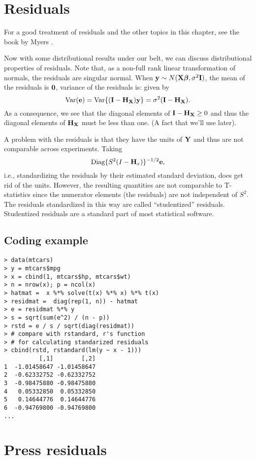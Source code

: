 \section{Residuals}

For a good treatment of residuals and the other topics in this chapter, 
see the book by Myers \citep{myers1990classical}.

Now with some distributional results under our belt, we can discuss distributional
properties of residuals. Note that, as a non-full rank linear transformation of
normals, the residuals are singular normal. When $\mathbf{y} \sim N(\mathbf{X} \boldsymbol{\beta}, \sigma^2 \mathbf{I})$, the mean of the residuals is $\mathbf{0}$, variance of the residuals is:
given by
$$
\mbox{Var}(\mathbf{e}) = \mbox{Var}\{(\mathbf{I} - \mathbf{H}_{\mathbf{X}})\mathbf{y}\} = \sigma^2 (\mathbf{I} - \mathbf{H}_{\mathbf{X}}).
$$
As a consequence, we see that the diagonal elements of $\mathbf{I} - \mathbf{H}_{\mathbf{X}} \geq 0$
and thus the diagonal elements of $\mathbf{H}_{\mathbf{X}}$ must be less than one. (A fact that
we'll use later). 

A problem with the residuals is that they have the units of $\mathbf{Y}$ and thus are
not comparable across experiments. Taking 
$$\mbox{Diag}\{S^2(I - \mathbf{H}_x)\}^{-1/2}\mathbf{e},$$ 
i.e., standardizing the residuals by their estimated standard deviation, does
get rid of the units. However, the resulting quantities are not comparable to
T-statistics since the numerator elements (the residuals) are not independent of $S^2$.
The residuals standardized in this way are called ``studentized'' residuals. 
Studentized residuals are a standard part of most statistical software.

\subsection{Coding example}
\begin{verbatim}
> data(mtcars)
> y = mtcars$mpg
> x = cbind(1, mtcars$hp, mtcars$wt)
> n = nrow(x); p = ncol(x)
> hatmat =  x %*% solve(t(x) %*% x) %*% t(x)
> residmat =  diag(rep(1, n)) - hatmat
> e = residmat %*% y
> s = sqrt(sum(e^2) / (n - p))
> rstd = e / s / sqrt(diag(residmat))
> # compare with rstandard, r's function
> # for calculating standarized residuals
> cbind(rstd, rstandard(lm(y ~ x - 1)))
          [,1]        [,2]
1  -1.01458647 -1.01458647
2  -0.62332752 -0.62332752
3  -0.98475880 -0.98475880
4   0.05332850  0.05332850
5   0.14644776  0.14644776
6  -0.94769800 -0.94769800
...
\end{verbatim}

\section{Press residuals}
\label{sec:press}

